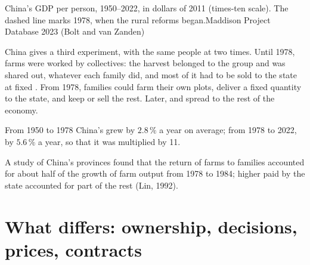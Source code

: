 \begin{omchart}{China's GDP per person, 1950--2022, in dollars of 2011 (times-ten scale). The dashed line
marks 1978, when the rural reforms began.}{Maddison Project Database 2023 (Bolt and van Zanden)}
\end{omchart}

China gives a third experiment, with the same people at two times. Until 1978, farms were worked by
collectives: the harvest belonged to the group and was shared out, whatever each family did, and most of it
had to be sold to the state at fixed . From 1978, families could farm their own plots, deliver a fixed
quantity to the state, and keep or sell the rest. Later,  and  spread to the rest of the
economy.

From 1950 to 1978 China's  grew by $2.8\,\%$ a year on average; from 1978 to 2022, by $5.6\,\%$
a year, so that it was multiplied by 11.

\begin{record}
A study of China's provinces found that the return of farms to families accounted for about half of the
growth of farm output from 1978 to 1984; higher  paid by the state accounted for part of the rest
(Lin, 1992).
\end{record}

\section{What differs: ownership, decisions, prices, contracts}

